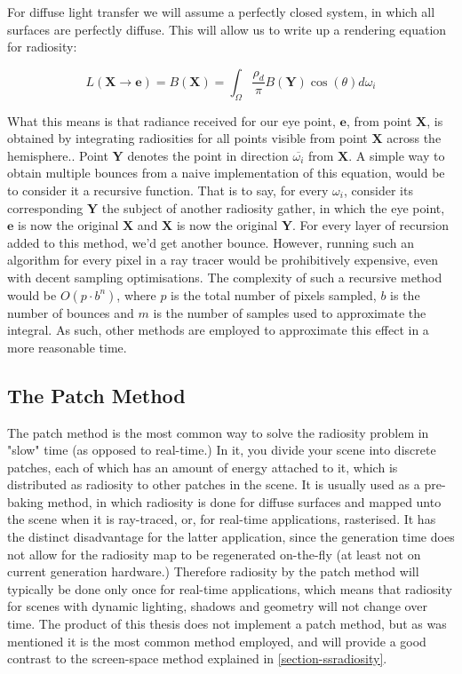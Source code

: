 For diffuse light transfer we will assume a perfectly closed system, in which all surfaces are perfectly diffuse. This will allow us to write up a rendering equation for radiosity:

$$L(\mathbf{\mathbf{X}} \rightarrow \mathbf{e}) = B(\mathbf{X}) = \int_\Omega \frac{\rho_d}{\pi} B(\mathbf{Y}) \cos(\theta) d\omega_i$$

What this means is that radiance received for our eye point, $\mathbf{e}$, from point $\mathbf{X}$, is obtained by integrating radiosities for all points visible from point $\mathbf{X}$ across the hemisphere.. Point $\mathbf{Y}$ denotes the point in direction $\overline{\omega_i}$ from $\mathbf{X}$. A simple way to obtain multiple bounces from a naive implementation of this equation, would be to consider it a recursive function. That is to say, for every $\omega_i$, consider its corresponding $\mathbf{Y}$ the subject of another radiosity gather, in which the eye point, $\mathbf{e}$ is now the original $\mathbf{X}$ and $\mathbf{X}$ is now the original $\mathbf{Y}$. For every layer of recursion added to this method, we'd get another bounce. However, running such an algorithm for every pixel in a ray tracer would be prohibitively expensive, even with decent sampling optimisations. The complexity of such a recursive method would be $O(p \cdot b^n)$, where $p$ is the total number of pixels sampled, $b$ is the number of bounces and $m$ is the number of samples used to approximate the integral. As such, other methods are employed to approximate this effect in a more reasonable time.

\subsection{The Patch Method}
The patch method is the most common way to solve the radiosity problem in "slow" time (as opposed to real-time.) In it, you divide your scene into discrete patches, each of which has an amount of energy attached to it, which is distributed as radiosity to other patches in the scene. It is usually used as a pre-baking method, in which radiosity is done for diffuse surfaces and mapped unto the scene when it is ray-traced, or, for real-time applications, rasterised. It has the distinct disadvantage for the latter application, since the generation time does not allow for the radiosity map to be regenerated on-the-fly (at least not on current generation hardware.) Therefore radiosity by the patch method will typically be done only once for real-time applications, which means that radiosity for scenes with dynamic lighting, shadows and geometry will not change over time. The product of this thesis does not implement a patch method, but as was mentioned it is the most common method employed, and will provide a good contrast to the screen-space method explained in \ref{section-ssradiosity}.

